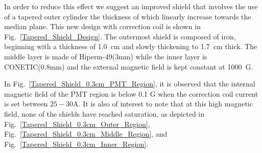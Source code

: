 \documentclass[12pt]{article}
\begin{document}
 In order to reduce  this  effect we suggest an improved shield 
 that involves the use of a tapered outer cylinder the   thickness of which  
linearly increase  towards the median plane.
This new  design with  correction coil   is shown in
 Fig.~\ref{Tapered_Shield_Design}.
The outermost  shield is composed of iron, beginning with a thickness of 1.0~cm and slowly thickening 
to 1.7~cm thick.  The middle layer is made of Hiperm-49(3mm)  while  the inner layer is CONETIC(0.8mm)
and the external magnetic field is kept constant at 1000~G.




In Fig.~\ref{Tapered_Shield_0.3cm_PMT_Region},
it is observed that the internal magnetic field of the PMT region is below 0.1 G when the correction coil current 
is set between $25-30$A. It is also of interest to note that at this high magnetic field, none of the shields have
 reached saturation, as depicted in Fig.~\ref{Tapered_Shield_0.3cm_Outer_Region}, Fig.~\ref{Tapered_Shield_0.3cm_Middle_Region},
 and Fig.~\ref{Tapered_Shield_0.3cm_Inner_Region}.




\end{document}
